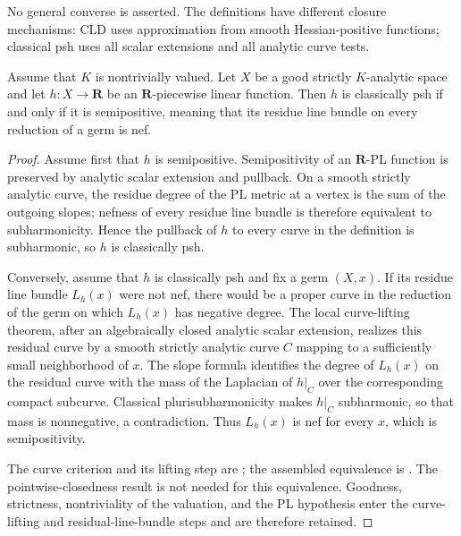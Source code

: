 No general converse is asserted.  The definitions have different closure
mechanisms: CLD uses approximation from smooth Hessian-positive functions;
classical psh uses all scalar extensions and all analytic curve tests.

\begin{theorem}\label{thm:gr-pl-comparison}
Assume that $K$ is nontrivially valued.  Let $X$ be a good strictly
$K$-analytic space and let $h:X\to\mathbf R$ be an $\mathbf R$-piecewise
linear function.  Then $h$ is classically psh if and only if it is
semipositive, meaning that its residue line bundle on every reduction of a
germ is nef.
\end{theorem}
\begin{proof}
Assume first that $h$ is semipositive.  Semipositivity of an
$\mathbf R$-PL function is preserved by analytic scalar extension and
pullback.  On a smooth strictly analytic curve, the residue degree of the PL
metric at a vertex is the sum of the outgoing slopes; nefness of every
residue line bundle is therefore equivalent to subharmonicity.  Hence the
pullback of $h$ to every curve in the definition is subharmonic, so $h$ is
classically psh.

Conversely, assume that $h$ is classically psh and fix a germ $(X,x)$.  If
its residue line bundle $L_h(x)$ were not nef, there would be a proper curve
in the reduction of the germ on which $L_h(x)$ has negative degree.  The
local curve-lifting theorem, after an algebraically closed analytic scalar
extension, realizes this residual curve by a smooth strictly analytic curve
$C$ mapping to a sufficiently small neighborhood of $x$.  The slope formula
identifies the degree of $L_h(x)$ on the residual curve with the mass of the
Laplacian of $h|_C$ over the corresponding compact subcurve.  Classical
plurisubharmonicity makes $h|_C$ subharmonic, so that mass is nonnegative, a
contradiction.  Thus $L_h(x)$ is nef for every $x$, which is semipositivity.

The curve criterion and its lifting step are
\cite[Theorem~5.3 and Corollary~5.4]{GR25PL}; the assembled equivalence is
\cite[Theorem~4.3]{GR25Classical}.  The pointwise-closedness result
\cite[Theorem~5.6]{GR25PL} is not needed for this equivalence.  Goodness,
strictness, nontriviality of the valuation, and the PL hypothesis enter the
curve-lifting and residual-line-bundle steps and are therefore retained.
\end{proof}

